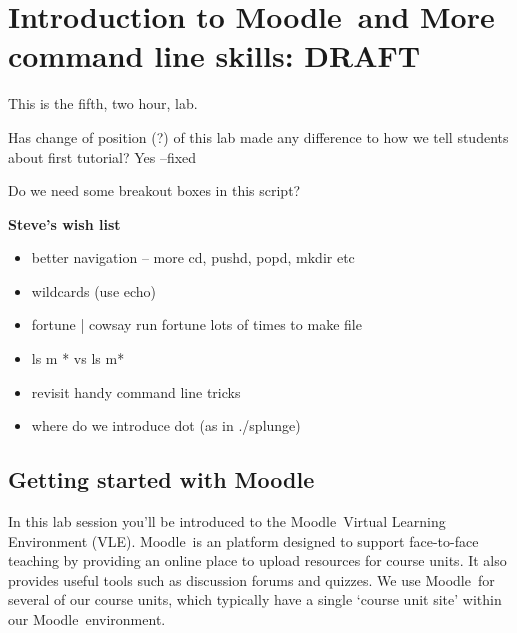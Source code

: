 
\newcommand{\moodle}{\textsf{Moodle}}
\newcommand{\Moodle}{\textsf{Moodle}}

\chapter[\Moodle\ Intro and More command line]{Introduction to \Moodle\ and More command line skills: DRAFT}

\minitoc


\begin{note}
  This is the fifth, two hour, lab.

  Has change of position (?) of this lab made any difference to how we tell students about first tutorial?  Yes --fixed

  Do we need some breakout boxes in this script?

  \textbf{Steve's wish list}
  \begin{itemize}
  \item better navigation -- more cd, pushd, popd, mkdir etc
  \item 
wildcards (use echo)
\item 
fortune | cowsay
run fortune lots of times to make file
\item 
ls m * vs ls m*
\item 
revisit handy command line tricks 
\item where do we introduce dot (as in ./splunge)

  \end{itemize}


\end{note}


\section{Getting started with \moodle}
\label{sec:introduction-moodle}

In this lab session you'll be introduced to the \moodle\ Virtual Learning Environment (VLE). \moodle\ is an  platform designed to support face-to-face teaching by providing an online place to upload resources for course units. It also provides useful  tools such as discussion forums and quizzes. We use \moodle\ for several of our course units, which typically have a single `course unit site' within our \moodle\ environment.

